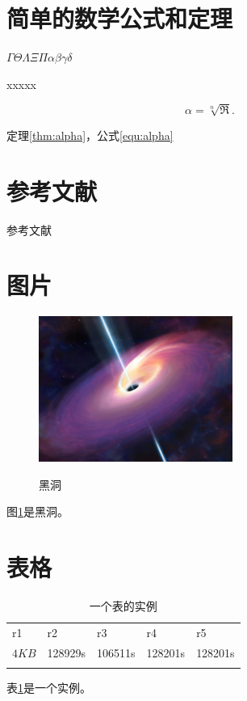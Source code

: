 \section{简单的数学公式和定理}
\begin{sthm}
$\Gamma\Theta\Lambda\Xi\Pi\alpha\beta\gamma\delta$
\end{sthm}

\begin{thm}\label{thm:alpha}
xxxxx
\end{thm}
\begin{equation}\label{equ:alpha}
\alpha=\sqrt[n]{\Re}.
\end{equation}
\par 定理\ref{thm:alpha}，公式\ref{equ:alpha}

\section{参考文献}
参考文献\cite{broder1997resemblance}\cite{broder1997syntactic}

\section{图片}
\begin{figure}
  \centering
  \includegraphics[width=2.5in]{images/blackhole.jpeg}\\
  \caption{黑洞}\label{img:logo}
\end{figure}
图\ref{img:logo}是黑洞。
\section{表格}
\begin{table}[!t]
    \centering
    \caption{一个表的实例}\label{table:tabobj}
    \renewcommand{\arraystretch}{1.5}
    \begin{tabular}{
    p{}<{\centering}p{}<{\centering}
    p{}<{\centering}p{}<{\centering}
    p{}<{\centering}}
        \Xhline{1.2pt}
         r1   &r2         &r3       &r4   &r5\\
        \Xhline{1.2pt}
        $4KB$                   &128929s   &106511s &128201s    &128201s\\
        \Xhline{1.2pt}
    \end{tabular}
\end{table}
表\ref{table:tabobj}是一个实例。
